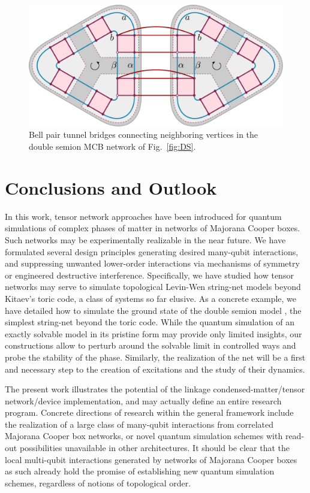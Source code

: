 \documentclass[twocolumn,floats,prx,showpacs]{revtex4-1}
\begin{document}
\begin{figure}
\includegraphics[width=0.9\columnwidth]{fig/tworing.pdf}
\caption{Bell pair tunnel bridges 
connecting neighboring vertices in the double semion MCB network of Fig.~\ref{fig:DS}.  }
\label{fig:tworings}
\end{figure}

\section{Conclusions and Outlook}\label{sec5}

In this work, tensor network approaches have been introduced for quantum simulations of complex phases of matter in networks of Majorana Cooper boxes.  Such networks may be experimentally realizable in the near future. We have formulated several design principles generating desired  many-qubit interactions, and suppressing unwanted lower-order interactions via mechanisms of symmetry or engineered destructive interference. 
Specifically, we have studied how tensor networks may serve to simulate topological Levin-Wen string-net models \cite{Levin2005,Wen2017} beyond Kitaev's toric code, a class of systems so far elusive.   As a concrete  example, we have detailed how to simulate the ground state of the double semion model \cite{Levin2005}, the  simplest string-net beyond the toric code.  While the quantum simulation of an exactly solvable model in its pristine form may  provide only limited insights,  our constructions  allow to perturb around the solvable limit in controlled ways and probe the stability of the phase. Similarly, the realization of the net will be a first and necessary step to the creation of excitations and the study of their dynamics.


The present work illustrates the potential of the linkage condensed-matter/tensor network/device implementation, and may actually define an
entire research program. Concrete  directions of research within the general framework include the realization of a   large class of many-qubit interactions from correlated Majorana Cooper box networks, or novel quantum simulation schemes \cite{CiracZollerSimulation,Roadmap} with read-out possibilities \cite{Plugge2017,Karzig2017} unavailable in other architectures.  It should be clear that the local multi-qubit interactions generated by  networks of Majorana Cooper boxes as such already hold the promise of establishing new quantum simulation schemes, regardless of
notions of topological order.
\end{document}
